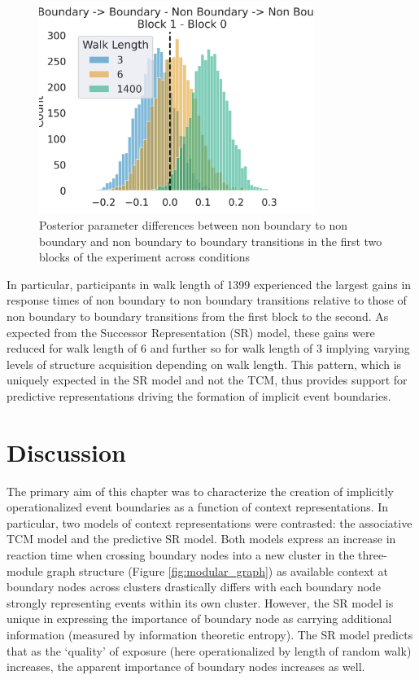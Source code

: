 \begin{figure}[h]
	\centering
	\includegraphics[width = 0.8\textwidth]{chapter_notebooks/chapter_2/figures/nb_b_diff.png}
	\caption{Posterior parameter differences between non boundary to non boundary and non boundary to boundary transitions in the first two blocks of the experiment across conditions}
	\label{fig:bayesmodel-firsttwoblocks}
\end{figure}

In particular, participants in walk length of 1399 experienced the largest gains in response times of non boundary to non boundary transitions relative to those of non boundary to boundary transitions from the first block to the second. As expected from the Successor Representation (SR) model, these gains were reduced for walk length of 6 and further so for walk length of 3 implying varying levels of structure acquisition depending on walk length. This pattern, which is uniquely expected in the SR model and not the TCM, thus provides support for predictive representations driving the formation of implicit event boundaries. 

\section{Discussion}

The primary aim of this chapter was to characterize the creation of implicitly operationalized event boundaries as a function of context representations. In particular, two models of context representations were contrasted: the associative TCM model and the predictive SR model. Both models express an increase in reaction time when crossing boundary nodes into a new cluster in the three-module graph structure (Figure \ref{fig:modular_graph}) as available context at boundary nodes across clusters drastically differs with each boundary node strongly representing events within its own cluster. However, the SR model is unique in expressing the importance of boundary node as carrying additional information (measured by information theoretic entropy). The SR model predicts that as the `quality' of exposure (here operationalized by length of random walk) increases, the apparent importance of boundary nodes increases as well. 

